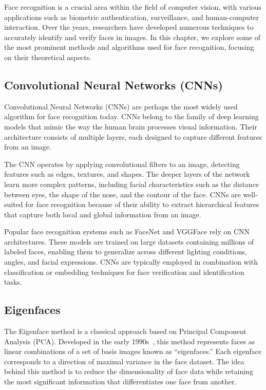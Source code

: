 Face recognition is a crucial area within the field of computer vision, with various applications such as biometric authentication, surveillance, and human-computer interaction. Over the years, researchers have developed numerous techniques to accurately identify and verify faces in images. In this chapter, we explore some of the most prominent methods and algorithms used for face recognition, focusing on their theoretical aspects.

\subsection{Convolutional Neural Networks (CNNs)}
Convolutional Neural Networks (CNNs) are perhaps the most widely used algorithm for face recognition today. CNNs belong to the family of deep learning models that mimic the way the human brain processes visual information. Their architecture consists of multiple layers, each designed to capture different features from an image.

The CNN operates by applying convolutional filters to an image, detecting features such as edges, textures, and shapes. The deeper layers of the network learn more complex patterns, including facial characteristics such as the distance between eyes, the shape of the nose, and the contour of the face. CNNs are well-suited for face recognition because of their ability to extract hierarchical features that capture both local and global information from an image.

Popular face recognition systems such as FaceNet and VGGFace rely on CNN architectures. These models are trained on large datasets containing millions of labeled faces, enabling them to generalize across different lighting conditions, angles, and facial expressions. CNNs are typically employed in combination with classification or embedding techniques for face verification and identification tasks.

\subsection{Eigenfaces}
The Eigenface method is a classical approach based on Principal Component Analysis (PCA). Developed in the early 1990s~\cite{turk1991eigenfaces}, this method represents faces as linear combinations of a set of basis images known as ``eigenfaces.'' Each eigenface corresponds to a direction of maximal variance in the face dataset. The idea behind this method is to reduce the dimensionality of face data while retaining the most significant information that differentiates one face from another.

